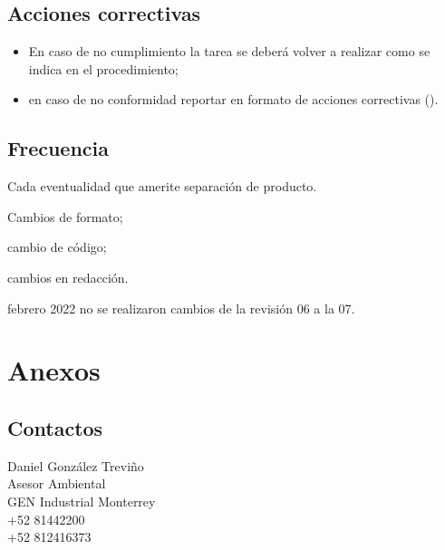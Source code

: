 \subsection{Acciones correctivas}
\begin{itemize}
	\item En caso de no cumplimiento la tarea se deberá volver a realizar como se indica en el procedimiento;
	\item en caso de no conformidad reportar en formato de acciones correctivas (\IdFormAACC).
\end{itemize}

\subsection{Frecuencia}

Cada eventualidad que amerite separación de producto.

\begin{changelog}[simple, sectioncmd=\subsection*,label=changelog-2.13]
	\begin{version}[v=2.0, date=2023--01, author=Pablo E. Alanis]
		\item Cambios de formato;
		\item cambio de código;
		\item cambios en redacción.
	\end{version}

	\begin{version}[v=1.9, date=2022--01, author=Agustín M.]
		\item febrero 2022 no se realizaron cambios de la revisión 06 a la 07.
	\end{version}
\end{changelog}

\newpage

\section*{Anexos}
\subsection*{Contactos}

\begin{contact}[GEN]\label{contacto:GEN}
\noindent Daniel González Treviño\\
Asesor Ambiental\\
GEN Industrial Monterrey\\
+52 81442200\\
+52 812416373
\end{contact}

